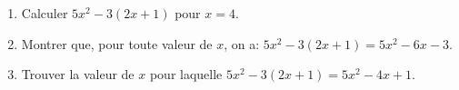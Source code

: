 
\medskip

\begin{enumerate}
\item Calculer $5x^2 - 3(2x+1)$ pour $x = 4$.
\item Montrer que, pour toute valeur de $x$, on a: $5x^2 - 3(2x + 1) = 5x^2 - 6x - 3$. 
\item Trouver la valeur de $x$ pour laquelle $5x^2 - 3(2x+1)= 5x^2 - 4x +1$.
\end{enumerate}



\vspace{0,5cm}

